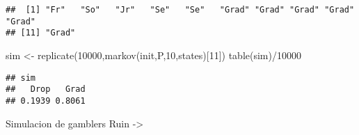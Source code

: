 \documentclass[
]{article}
\newenvironment{Shaded}{\begin{snugshade}}{\end{snugshade}}
\newcommand{\DecValTok}[1]{\textcolor[rgb]{0.00,0.00,0.81}{#1}}
\newcommand{\FunctionTok}[1]{\textcolor[rgb]{0.00,0.00,0.00}{#1}}
\newcommand{\NormalTok}[1]{#1}
\newcommand{\OtherTok}[1]{\textcolor[rgb]{0.56,0.35,0.01}{#1}}
\newcommand{\SpecialCharTok}[1]{\textcolor[rgb]{0.00,0.00,0.00}{#1}}
\begin{document}
\begin{verbatim}
##  [1] "Fr"   "So"   "Jr"   "Se"   "Se"   "Grad" "Grad" "Grad" "Grad" "Grad"
## [11] "Grad"
\end{verbatim}

\begin{Shaded}
\begin{Highlighting}[]
\NormalTok{sim }\OtherTok{\textless{}{-}} \FunctionTok{replicate}\NormalTok{(}\DecValTok{10000}\NormalTok{,}\FunctionTok{markov}\NormalTok{(init,P,}\DecValTok{10}\NormalTok{,states)[}\DecValTok{11}\NormalTok{])}
\FunctionTok{table}\NormalTok{(sim)}\SpecialCharTok{/}\DecValTok{10000}
\end{Highlighting}
\end{Shaded}

\begin{verbatim}
## sim
##   Drop   Grad 
## 0.1939 0.8061
\end{verbatim}

Simulacion de gamblers Ruin -\textgreater{}
\end{document}
